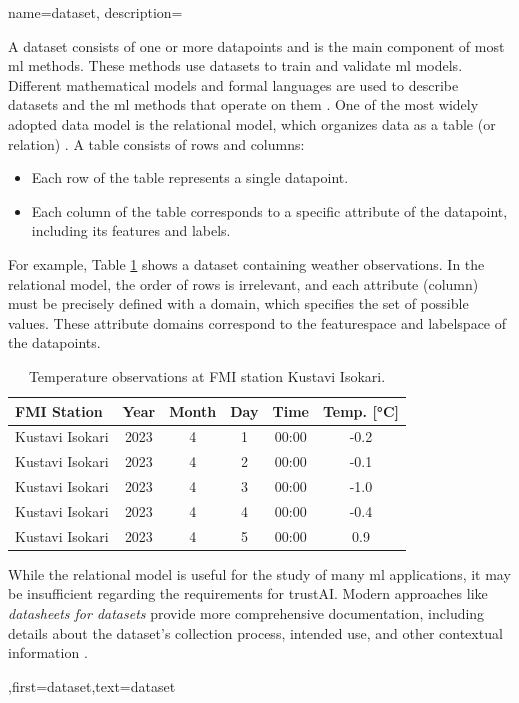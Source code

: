 {name={dataset},
	description={A dataset consists of one or more \gls{datapoint}s and is 
		the main component of most \gls{ml} methods. These methods use datasets to train and 
		validate \gls{ml} \gls{model}s. Different mathematical models and formal languages are 
		used to describe datasets and the \gls{ml} methods that operate on them \cite{silberschatz2019database,abiteboul1995foundations,hoberman2009data,ramakrishnan2002database}. 
		One of the most widely adopted data model is the relational model, 
		which organizes data as a table (or relation) \cite{silberschatz2019database}.
		A table consists of rows and columns:
		\begin{itemize} 
		\item Each row of the table represents a single \gls{datapoint}.
		\item Each column of the table corresponds to a specific attribute of the \gls{datapoint}, including its \gls{feature}s and \gls{label}s.
		\end{itemize}
		For example, Table \ref{tab:temperature_dict} shows a dataset containing weather observations. 
		In the relational model, the order of rows is irrelevant, and each attribute (column) must be 
		precisely defined with a domain, which specifies the set of possible values. These attribute 
		domains correspond to the \gls{featurespace} and \gls{labelspace} of the \gls{datapoint}s.
		\begin{table}[ht]
	\centering
	\begin{tabular}{|l|c|c|c|c|c|}
		\hline
		\textbf{FMI Station} & \textbf{Year} & \textbf{Month} & \textbf{Day} & \textbf{Time} & \textbf{Temp. [°C]} \\ 
		\hline
		Kustavi Isokari & 2023 & 4 & 1 & 00:00 & -0.2 \\ \hline
		Kustavi Isokari & 2023 & 4 & 2 & 00:00 & -0.1 \\ \hline
		Kustavi Isokari & 2023 & 4 & 3 & 00:00 & -1.0 \\ \hline
		Kustavi Isokari & 2023 & 4 & 4 & 00:00 & -0.4 \\ \hline
		Kustavi Isokari & 2023 & 4 & 5 & 00:00 & 0.9 \\ \hline
	\end{tabular}
	\caption{Temperature observations at FMI station Kustavi Isokari.}
	\label{tab:temperature_dict}
\end{table}
 While the relational model is useful for the study of many \gls{ml} applications, it may be 
 insufficient regarding the requirements for \gls{trustAI}. Modern 
 approaches like \emph{datasheets for datasets} provide more comprehensive 
 documentation, including details about the dataset’s collection process, intended 
 use, and other contextual information \cite{DatasheetData2021}.},first={dataset},text={dataset}  
}

